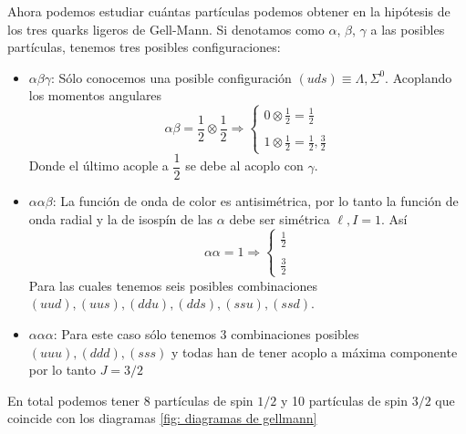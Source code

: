 Ahora podemos estudiar cuántas partículas podemos obtener en la hipótesis de los tres quarks ligeros de Gell-Mann. Si denotamos como $\alpha$, $\beta$, $\gamma$ a las posibles partículas, tenemos tres posibles configuraciones:
\begin{itemize}
    \item $\alpha \beta \gamma$: Sólo conocemos una posible configuración $(uds)\equiv \Lambda, \Sigma^0$. Acoplando los momentos angulares
    $$\alpha \beta=\frac{1}{2}\otimes \frac{1}{2} \Rightarrow \left \{ \begin{aligned}
        0 \otimes \frac{1}{2}= \frac{1}{2} \\\\ 1\otimes \frac{1}{2} = \frac{1}{2},\frac{3}{2}
    \end{aligned}\right. $$
    Donde el último acople a $\dfrac{1}{2}$ se debe al acoplo con $\gamma$.
\item $\alpha \alpha \beta$: La función de onda de color es antisimétrica, por lo tanto la función de onda radial y la de isospín  de las $\alpha$ debe ser simétrica $\ell,I=1$. Así $$\alpha \alpha =1 \Rightarrow \left \{ \begin{aligned}
     \frac{1}{2} \\\\ \frac{3}{2}
    \end{aligned}\right. $$
Para las cuales tenemos seis posibles combinaciones $(uud),(uus),(ddu),(dds),(ssu),(ssd)$.
\item $\alpha \alpha \alpha$: Para este caso sólo tenemos 3 combinaciones posibles $(uuu), (ddd), (sss)$ y todas han de tener acoplo a máxima componente por lo tanto $J=3/2$
\end{itemize}
En total podemos tener 8 partículas de spin $1/2$ y 10 partículas de spin $3/2$ que coincide con los diagramas \ref{fig: diagramas de gellmann}
